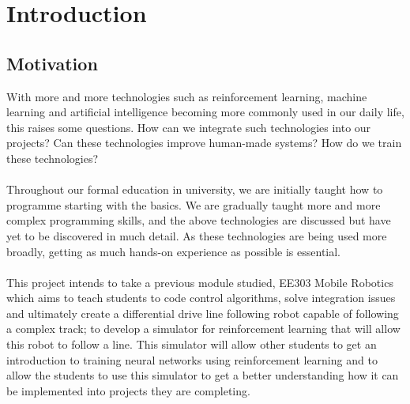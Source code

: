 \documentclass[a4paper,12pt]{article}
\begin{document}


\tableofcontents


\pagebreak
\listoffigures
\pagebreak
\listoftables
\pagebreak

\section{Introduction}
\subsection{Motivation}

With more and more technologies such as reinforcement learning, machine learning and artificial intelligence becoming more commonly used in our daily life, this raises some questions. How can we integrate such technologies into our projects? Can these technologies improve human-made systems? How do we train these technologies?
\\\\
Throughout our formal education in university, we are initially taught how to programme starting with the basics. We are gradually taught more and more complex programming skills, and the above technologies are discussed but have yet to be discovered in much detail. As these technologies are being used more broadly, getting as much hands-on experience as possible is essential.
\\\\
This project intends to take a previous module studied, EE303 Mobile Robotics which aims to teach students to code control algorithms, solve integration issues and ultimately create a differential drive line following robot capable of following a complex track; to develop a simulator for reinforcement learning that will allow this robot to follow a line. This simulator will allow other students to get an introduction to training neural networks using reinforcement learning and to allow the students to use this simulator to get a better understanding how it can be implemented into projects they are completing.
\end{document}
